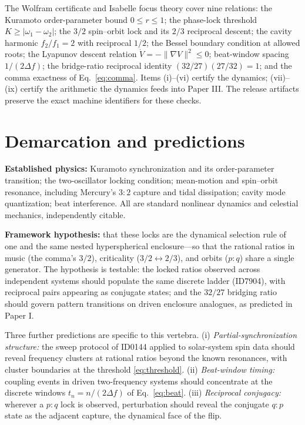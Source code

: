 \documentclass[11pt]{article}
\theoremstyle{remark}
\begin{document}
The Wolfram certificate and Isabelle focus theory cover nine relations: the Kuramoto order-parameter bound $0 \leq r \leq 1$; the phase-lock threshold $K \geq |\omega_1-\omega_2|$; the $3/2$ spin--orbit lock and its $2/3$ reciprocal descent; the cavity harmonic $f_2/f_1 = 2$ with reciprocal $1/2$; the Bessel boundary condition at allowed roots; the Lyapunov descent relation $\dot{V} = -\|\nabla V\|^2 \leq 0$; beat-window spacing $1/(2\Delta f)$; the bridge-ratio reciprocal identity $(32/27)(27/32)=1$; and the comma exactness of Eq.~\eqref{eq:comma}. Items (i)--(vi) certify the dynamics; (vii)--(ix) certify the arithmetic the dynamics feeds into Paper III. The release artifacts preserve the exact machine identifiers for these checks.

\section{Demarcation and predictions}
\label{sec:demarcation}

\textbf{Established physics:} Kuramoto synchronization and its order-parameter transition; the two-oscillator locking condition; mean-motion and spin--orbit resonance, including Mercury's $3{:}2$ capture and tidal dissipation; cavity mode quantization; beat interference. All are standard nonlinear dynamics and celestial mechanics, independently citable.

\textbf{Framework hypothesis:} that these locks are the dynamical selection rule of one and the same nested hyperspherical enclosure---so that the rational ratios in music (the comma's $3/2$), criticality ($3/2 \leftrightarrow 2/3$), and orbits ($p{:}q$) share a single generator. The hypothesis is testable: the locked ratios observed across independent systems should populate the same discrete ladder (ID7904), with reciprocal pairs appearing as conjugate states; and the $32/27$ bridging ratio should govern pattern transitions on driven enclosure analogues, as predicted in Paper I.

Three further predictions are specific to this vertebra. (i) \emph{Partial-synchronization structure:} the sweep protocol of ID0144 applied to solar-system spin data should reveal frequency clusters at rational ratios beyond the known resonances, with cluster boundaries at the threshold \eqref{eq:threshold}. (ii) \emph{Beat-window timing:} coupling events in driven two-frequency systems should concentrate at the discrete windows $t_n = n/(2\Delta f)$ of Eq.~\eqref{eq:beat}. (iii) \emph{Reciprocal conjugacy:} wherever a $p{:}q$ lock is observed, perturbation should reveal the conjugate $q{:}p$ state as the adjacent capture, the dynamical face of the flip.
\end{document}
